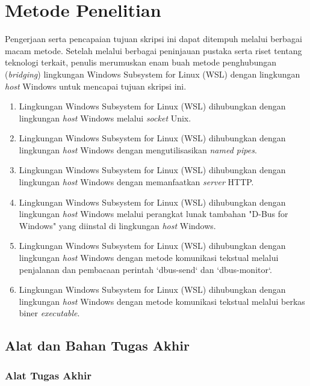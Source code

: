 \chapter{Metode Penelitian}

Pengerjaan serta pencapaian tujuan skripsi ini dapat ditempuh melalui berbagai macam metode. Setelah melalui berbagai peninjauan pustaka serta riset tentang teknologi terkait, penulis merumuskan enam buah metode penghubungan (\textit{bridging}) lingkungan Windows Subsystem for Linux (WSL) dengan lingkungan \textit{host} Windows untuk mencapai tujuan skripsi ini.
\begin{enumerate}
    \item Lingkungan Windows Subsystem for Linux (WSL) dihubungkan dengan lingkungan \textit{host} Windows melalui \textit{socket} Unix.
    \item Lingkungan Windows Subsystem for Linux (WSL) dihubungkan dengan lingkungan \textit{host} Windows dengan mengutilisasikan \textit{named pipes}.
    \item Lingkungan Windows Subsystem for Linux (WSL) dihubungkan dengan lingkungan \textit{host} Windows dengan memanfaatkan \textit{server} HTTP.
    \item Lingkungan Windows Subsystem for Linux (WSL) dihubungkan dengan lingkungan \textit{host} Windows melalui perangkat lunak tambahan "D-Bus for Windows" yang diinstal di lingkungan \textit{host} Windows.
    \item Lingkungan Windows Subsystem for Linux (WSL) dihubungkan dengan lingkungan \textit{host} Windows dengan metode komunikasi tekstual melalui penjalanan dan pembacaan perintah `dbus-send` dan `dbus-monitor`.
    \item Lingkungan Windows Subsystem for Linux (WSL) dihubungkan dengan lingkungan \textit{host} Windows dengan metode komunikasi tekstual melalui berkas biner \textit{executable}.
\end{enumerate}

\section{Alat dan Bahan Tugas Akhir}

\subsection{Alat Tugas Akhir}

